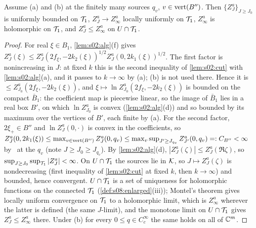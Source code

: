 \begin{lemma}\label{lem:s08:W1}
Assume \Wtwo(a) and \Wtwo(b) at the finitely many sources $q_v$, $v\in\operatorname{vert}(B'')$. Then $\{Z^a_J\}_{J\ge J_0}$ is uniformly bounded on $\mathcal T_1$, $Z^a_J\to Z^a_\infty$ locally uniformly on $\mathcal T_1$, $Z^a_\infty$ is holomorphic on $\mathcal T_1$, and $Z^a_J\le Z^a_\infty$ on $U\cap\mathcal T_1$.
\end{lemma}

\begin{proof}
For real $\xi\in B_1$, \cref{lem:s02:alg}(f) gives $Z^a_J(\xi)\le Z^a_J(2f_\xi,-2k_2(\xi))^{1/2}Z^a_J(0,2k_1(\xi))^{1/2}$. The first factor is nonincreasing in $J$: at fixed $k$ this is the second inequality of \cref{lem:s02:cut} with \cref{lem:s02:alg}(a), and it passes to $k\to\infty$ by \Wtwo(a); \Wtwo(b) is not used there. Hence it is $\le Z^a_{J_0}(2f_\xi,-2k_2(\xi))$, and $\xi\mapsto\ln Z^a_{J_0}(2f_\xi,-2k_2(\xi))$ is bounded on the compact $\bar B_1$: the coefficient map is piecewise linear, so the image of $\bar B_1$ lies in a real box $B'$, on which $\ln Z^a_{J_0}$ is convex (\cref{lem:s02:alg}(d)) and so bounded by its maximum over the vertices of $B'$, each finite by \Wtwo(a). For the second factor, $2\xi_+\in B''$ and $\ln Z^a_J(0,\cdot)$ is convex in the coefficients, so $Z^a_J(0,2k_1(\xi))\le\max_{v\in\operatorname{vert}(B'')}Z^a_J(0,q_v)\le\max_v\sup_{J'\ge J_{q_v}}Z^a_{J'}(0,q_v)=: C_{B''}<\infty$ by \Wtwo\ at the $q_v$ (note $J\ge J_0\ge J_{q_v}$). By \cref{lem:s02:alg}(d), $|Z^a_J(\zeta)|\le Z^a_J(\Re\zeta)$, so $\sup_{J\ge J_0}\sup_{\mathcal T_1}|Z^a_J|<\infty$. On $U\cap\mathcal T_1$ the sources lie in $\mathcal K$, so $J\mapsto Z^a_J(\zeta)$ is nondecreasing (first inequality of \cref{lem:s02:cut} at fixed $k$, then $k\to\infty$) and bounded, hence convergent. $U\cap\mathcal T_1$ is a set of uniqueness for holomorphic functions on the connected $\mathcal T_1$ (\cref{def:s08:enlarged}(iii)); Montel's theorem gives locally uniform convergence on $\mathcal T_1$ to a holomorphic limit, which is $Z^a_\infty$ wherever the latter is defined (the same $J$-limit), and the monotone limit on $U\cap\mathcal T_1$ gives $Z^a_J\le Z^a_\infty$ there. Under \Wtwo(b) for every $0\le q\in C^\infty_c$ the same holds on all of $\mathbb C^m$.
\end{proof}

